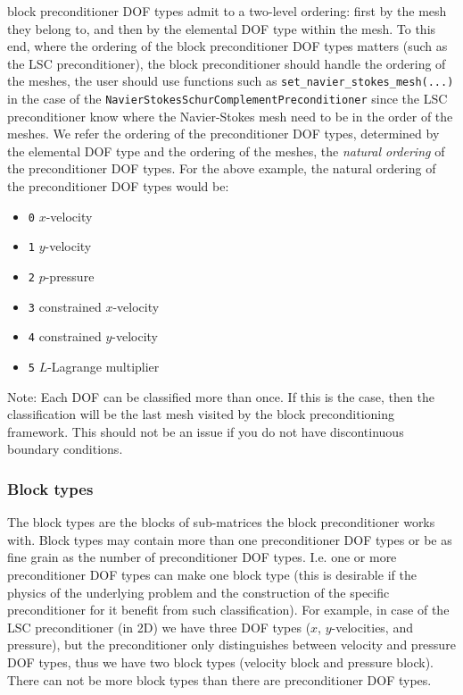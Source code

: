 block preconditioner DOF types admit to a two-level ordering: first by the mesh 
they belong to, and then by the elemental DOF type within the mesh. To this end, 
where the ordering of the block preconditioner DOF types matters (such as the 
LSC preconditioner), the block preconditioner should handle the ordering of the 
meshes, the user should use functions such as 
\texttt{set\_\allowbreak navier\_\allowbreak stokes\_\allowbreak mesh(...)}
in the case of the 
\texttt{Navier\allowbreak Stokes\allowbreak Schur\allowbreak Complement\allowbreak Preconditioner} 
since the LSC preconditioner know where the Navier-Stokes mesh need to be in 
the order of the meshes. We refer the ordering of the preconditioner DOF types, 
determined by the elemental DOF type and the ordering of the meshes, the 
\emph{natural ordering} of the preconditioner DOF types. For the above example, 
the natural ordering of the preconditioner DOF
types would be:
\begin{itemize}
 \item \texttt{0} $x$-velocity
 \item \texttt{1} $y$-velocity
 \item \texttt{2} $p$-pressure
 \item \texttt{3} constrained $x$-velocity
 \item \texttt{4} constrained $y$-velocity
 \item \texttt{5} $L$-Lagrange multiplier
\end{itemize}
Note: Each DOF can be classified more than once. If this is the case, then the 
classification will be the last mesh visited by the block preconditioning 
framework. This should not be an issue if you do not have discontinuous 
boundary conditions.

\subsubsection{Block types}
The block types are the blocks of sub-matrices the block preconditioner works 
with. Block types may contain more than one preconditioner DOF types or be as 
fine grain as the number of preconditioner DOF types. I.e. one or more 
preconditioner DOF types can make one block type (this is desirable if the 
physics of the underlying problem and the construction of the specific
preconditioner for it benefit from such classification). For example, in case 
of the LSC preconditioner (in 2D) we have three DOF types ($x$, $y$-velocities, 
and pressure), but the preconditioner only distinguishes between velocity and 
pressure DOF types, thus we have two block types (velocity block and pressure 
block). There can not be more block types than there are preconditioner DOF
types. 


